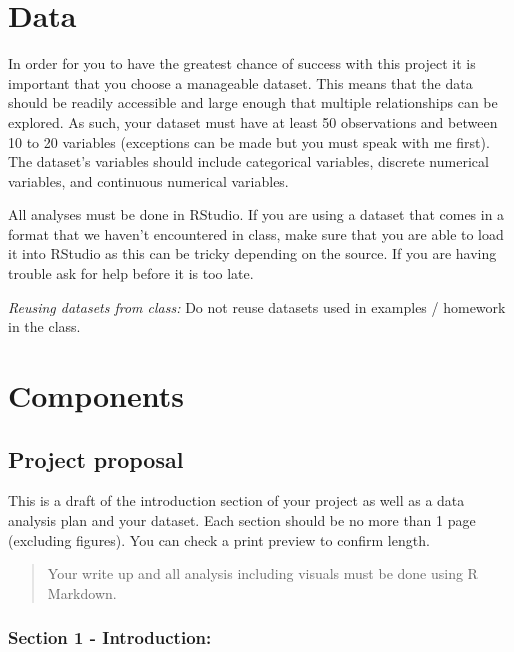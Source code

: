\documentclass[
]{book}
\begin{document}
\hypertarget{data}{%
\section{Data}\label{data}}

In order for you to have the greatest chance of success with this project it is important that
you choose a manageable dataset. This means that the data should be readily accessible and large
enough that multiple relationships can be explored. As such, your dataset must have at least 50
observations and between 10 to 20 variables (exceptions can be made but you must speak with me
first). The dataset's variables should include categorical variables, discrete numerical
variables, and continuous numerical variables.

All analyses must be done in RStudio. If you are using a dataset that comes in a format that
we haven't encountered in class, make sure that you are able to load it into RStudio as this
can be tricky depending on the source. If you are having trouble ask for help before it is too late.

\emph{Reusing datasets from class:} Do not reuse datasets used in examples / homework in the
class.

\hypertarget{components}{%
\section{Components}\label{components}}

\hypertarget{project-proposal}{%
\subsection{Project proposal}\label{project-proposal}}

This is a draft of the introduction section of your project as well as a
data analysis plan and your dataset. Each section should be no more than 1
page (excluding figures). You can check a print preview to confirm length.

\begin{quote}
Your write up and all analysis including visuals must be done using R Markdown.
\end{quote}

\hypertarget{section-1---introduction}{%
\subsubsection{Section 1 - Introduction:}\label{section-1---introduction}}
\end{document}
